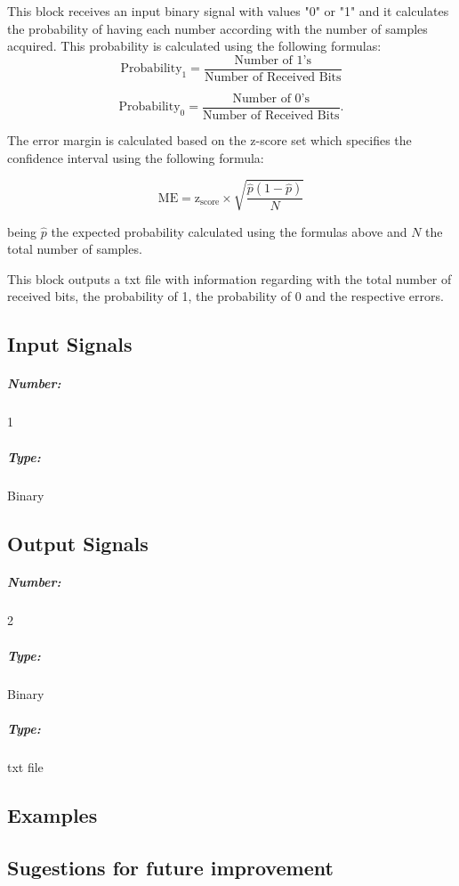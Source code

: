 This block receives an input binary signal with values "0" \space or "1" \space and it calculates the probability of having each number according with the number of samples acquired. This probability is calculated using the following formulas:
\begin{equation}\label{eq:prob1}
  \textrm{Probability}_{1}=\frac{\textrm{Number of 1's}}{\textrm{Number of Received Bits}}
\end{equation}

\begin{equation}\label{eq:prob0}
  \textrm{Probability}_{0}=\frac{\textrm{Number of 0's}}{\textrm{Number of Received Bits}}.
\end{equation}

The error margin is calculated based on the z-score set which specifies the confidence interval using the following formula:

\begin{equation}\label{eq:marginerror}
  \textrm{ME} = \textrm{z}_{\textrm{score}}\times \sqrt{\frac{\hat{p}(1-\hat{p})}{N}}
\end{equation}

being $\hat{p}$ the expected probability calculated using the formulas above and $N$ the total number of samples.

This block outputs a txt file with information regarding with the total number of received bits, the probability of 1, the probability of 0 and the respective errors.

\subsection*{Input Signals}


\subparagraph*{Number:} 1

\subparagraph*{Type:} Binary

\subsection*{Output Signals}

\subparagraph*{Number:} 2

\subparagraph*{Type:} Binary
\subparagraph*{Type:} txt file

\subsection*{Examples}



\subsection*{Sugestions for future improvement}



